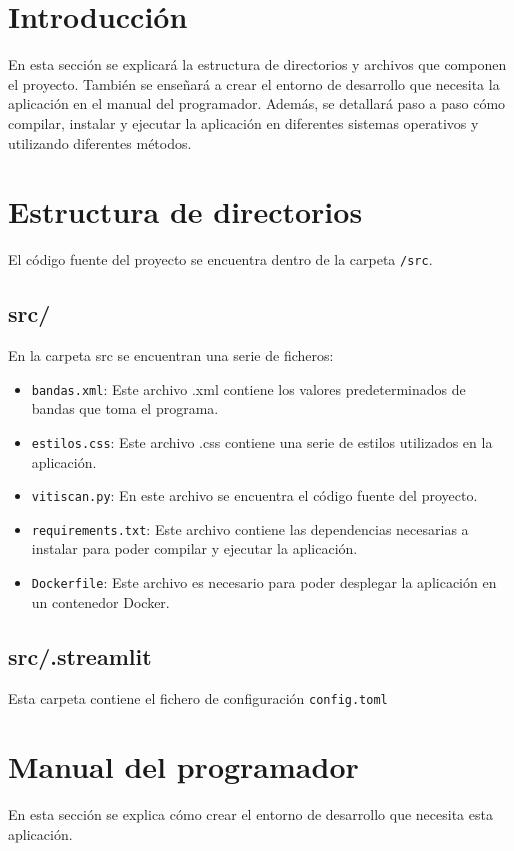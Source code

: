 
\section{Introducción}
En esta sección se explicará la estructura de directorios y archivos que componen el proyecto. También se enseñará a crear el entorno de desarrollo que necesita la aplicación en el manual del programador. Además, se detallará paso a paso cómo compilar, instalar y ejecutar la aplicación en diferentes sistemas operativos y utilizando diferentes métodos.

\section{Estructura de directorios}
El código fuente del proyecto se encuentra dentro de la carpeta \verb|/src|.

\subsection{src/}
En la carpeta src se encuentran una serie de ficheros:
\begin{itemize}
    \item \verb|bandas.xml|: Este archivo .xml contiene los valores predeterminados de bandas que toma el programa.
    \item \verb|estilos.css|: Este archivo .css contiene una serie de estilos utilizados en la aplicación.
    \item \verb|vitiscan.py|: En este archivo se encuentra el código fuente del proyecto.  
    \item \verb|requirements.txt|: Este archivo contiene las dependencias necesarias a instalar para poder compilar y ejecutar la aplicación.
    \item \verb|Dockerfile|: Este archivo es necesario para poder desplegar la aplicación en un contenedor Docker.
\end{itemize}

\subsection{src/.streamlit}
Esta carpeta contiene el fichero de configuración \verb|config.toml|

\section{Manual del programador}
En esta sección se explica cómo crear el entorno de desarrollo que necesita esta aplicación.

